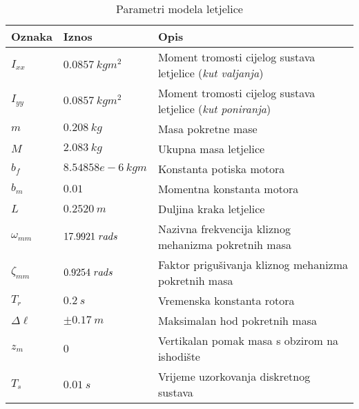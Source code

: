 \documentclass[11pt,a4paper]{article}
\begin{document}
\setlength\extrarowheight{1pt}
\begin{table}[h]
\centering
\caption{Parametri modela letjelice}
\label{params}
\begin{tabular}{lll}
\hline
\textbf{Oznaka} &  \textbf{Iznos}  &  \textbf{Opis}   \\ \hline 
$I_{xx}$ & $0.0857 \ kgm^{2}$ & Moment tromosti cijelog sustava letjelice (\textit{kut valjanja})   \\ 
$I_{yy}$ & $0.0857 \ kg m^{2}$ &  Moment tromosti cijelog sustava letjelice (\textit{kut poniranja})\\ 
$m$ & $0.208 \ kg$ &  Masa pokretne mase    \\ 
$M$ & $2.083 \ kg$ & Ukupna masa letjelice      \\ 
$b_{f}$ & $8.54858e-6 \ kgm$& Konstanta potiska motora     \\ 
$b_{m}$ & $0.01$& Momentna konstanta motora     \\ 
$ L$ & $0.2520 \ m $ &  Duljina kraka letjelice    \\ 
$\omega_{mm} $ & $ 17.9921 \ rad\/s$ & Nazivna frekvencija kliznog mehanizma pokretnih masa     \\
$\zeta_{mm} $ & $ 0.9254 \ rad\/s$ & Faktor prigušivanja kliznog mehanizma pokretnih masa      \\  
$T_{r} $ & $ 0.2 \ s$ &  Vremenska konstanta rotora    \\
$\Delta \ell $ & $\pm0.17 \ m $ &  Maksimalan hod pokretnih masa    \\  
$z_{m} $ & $ 0$ & Vertikalan pomak masa s obzirom na ishodište     \\ 
$T_{s} $ & $ 0.01 \ s$ &  Vrijeme uzorkovanja diskretnog sustava    \\ \hline
\end{tabular}
\end{table}
\end{document}
